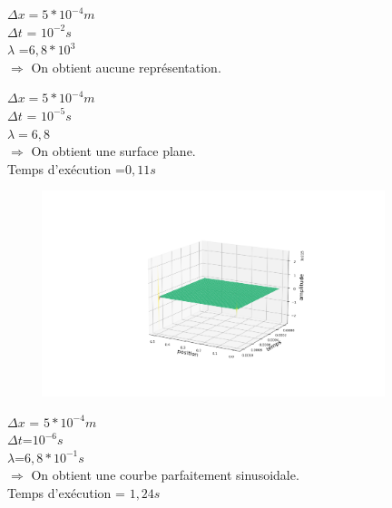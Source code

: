 \begin{enumerate}[label=\alph*)]
\begin{minipage}{.5\textwidth}%

\item $\Delta x =  5*{10}^{-4}m$\\
$\Delta t$ = ${10}^{-2} s $\\
$\lambda$ =$6,8*{10}^{3}$\\

$\Longrightarrow$ On obtient aucune représentation.

\end{minipage}


\begin{minipage}{.5\textwidth}%

\item $\Delta x = 5*{10}^{-4}m$\\
$\Delta t$ = ${10}^{-5} s $ \\
$\lambda =6,8$\\

$\Longrightarrow$ On obtient une surface plane.\\
Temps d'exécution =$0,11s$


\end{minipage}%
\hfill
\begin{minipage}{.45\textwidth}%
\includegraphics[width=12cm,height=6cm]{explicited.png}

\end{minipage}%

\begin{minipage}{.5\textwidth}%

\item $\Delta x$ = $5*{10}^{-4}m$\\
$\Delta t$=${10}^{-6} s $ \\
$\lambda$=$6,8*{10}^{-1}s$\\

$\Longrightarrow$ On obtient une courbe parfaitement sinusoidale.\\
Temps d'exécution = $1,24s$


\end{minipage}
\end{enumerate}
